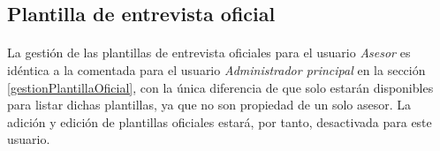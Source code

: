 \subsection{Plantilla de entrevista oficial}

  \paragraph{}La gestión de las plantillas de entrevista oficiales para el
  usuario \textit{Asesor} es idéntica a la comentada para el usuario
  \textit{Administrador principal} en la sección \ref{gestionPlantillaOficial},
  con la única diferencia de que solo estarán disponibles para listar dichas
  plantillas, ya que no son propiedad de un solo asesor. La adición y edición
  de plantillas oficiales estará, por tanto, desactivada para este usuario.